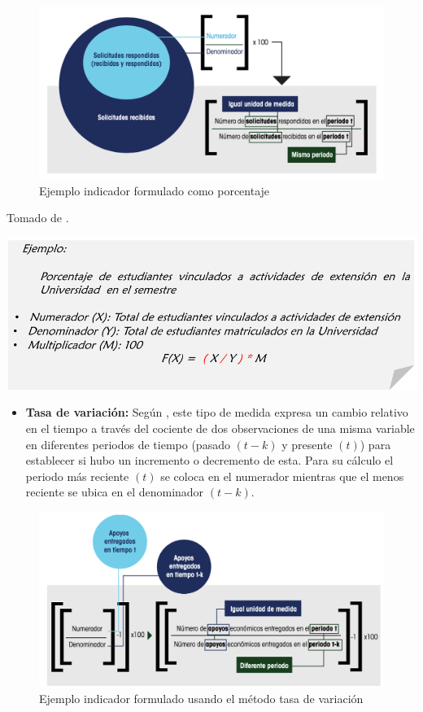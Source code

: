 \documentclass[
]{book}
\providecommand{\tightlist}{%
  \setlength{\itemsep}{0pt}\setlength{\parskip}{0pt}}
\begin{document}
\begin{figure}

{\centering \includegraphics[width=0.9\linewidth]{Imagenes/figura_12} 

}

\caption{Ejemplo indicador formulado como porcentaje}\label{fig:unnamed-chunk-6}
\end{figure}

Tomado de \citet{coneval2013manual}.

\begin{center}\includegraphics[width=0.7\linewidth]{Imagenes/texto_2} \end{center}

\begin{itemize}
\tightlist
\item
  \textbf{Tasa de variación:}
  Según \citet{coneval2013manual}, este tipo de medida expresa un cambio relativo en el tiempo a través del cociente de dos observaciones de una misma variable en diferentes periodos de tiempo (pasado \((t-k)\) y presente \((t)\)) para establecer si hubo un incremento o decremento de esta. Para su cálculo el periodo más reciente \((t)\) se coloca en el numerador mientras que el menos reciente se ubica en el denominador \((t-k)\).
\end{itemize}

\begin{figure}

{\centering \includegraphics[width=0.9\linewidth]{Imagenes/figura_13} 

}

\caption{Ejemplo indicador formulado usando el método tasa de variación}\label{fig:unnamed-chunk-8}
\end{figure}
\end{document}
